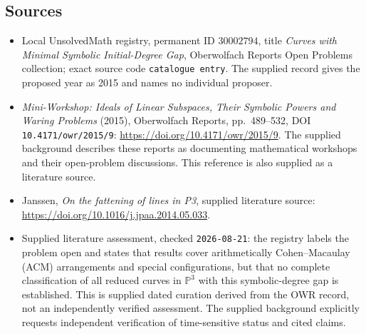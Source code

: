 \documentclass[11pt]{article}
\newcommand{\PP}{\mathbb{P}}
\begin{document}
\subsection{Sources}
\begin{itemize}
\item Local UnsolvedMath registry, permanent ID \(30002794\), title \emph{Curves with Minimal Symbolic Initial-Degree Gap}, Oberwolfach Reports Open Problems collection; exact source code \texttt{catalogue entry}. The supplied record gives the proposed year as 2015 and names no individual proposer.
\item \emph{Mini-Workshop: Ideals of Linear Subspaces, Their Symbolic Powers and Waring Problems} (2015), Oberwolfach Reports, pp.\ 489--532, DOI \texttt{10.4171/owr/2015/9}: \url{https://doi.org/10.4171/owr/2015/9}. The supplied background describes these reports as documenting mathematical workshops and their open-problem discussions. This reference is also supplied as a literature source.
\item Janssen, \emph{On the fattening of lines in P3}, supplied literature source: \url{https://doi.org/10.1016/j.jpaa.2014.05.033}.
\item Supplied literature assessment, checked \texttt{2026-08-21}: the registry labels the problem open and states that results cover arithmetically Cohen--Macaulay (ACM) arrangements and special configurations, but that no complete classification of all reduced curves in \(\PP^3\) with this symbolic-degree gap is established. This is supplied dated curation derived from the OWR record, not an independently verified assessment. The supplied background explicitly requests independent verification of time-sensitive status and cited claims.
\end{itemize}
\end{document}
